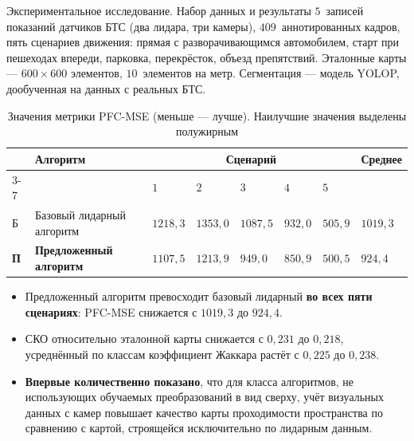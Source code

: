 \begin{frame}{Экспериментальное исследование. Набор данных и результаты}
	\fontsize{7}{8.4}\selectfont
	$5$~записей показаний датчиков БТС (два лидара, три камеры), $409$~аннотированных кадров, пять сценариев движения: прямая с разворачивающимся автомобилем, старт при пешеходах впереди, парковка, перекрёсток, объезд препятствий. Эталонные карты --- $600\times600$ элементов, $10$~элементов на метр. Сегментация --- модель YOLOP, дообученная на данных с реальных БТС.
	\begin{table}
		\footnotesize
		\centering
		\begin{tabular}{|p{}|p{}|p{}|p{}|p{}|p{}|p{}|p{}|}
			\hline
			& \textbf{Алгоритм} & \multicolumn{5}{c|}{\textbf{Сценарий}} & \textbf{Среднее} \\
			\cline{3-7}
			& & $1$ & $2$ & $3$ & $4$ & $5$ & \\
			\hline
			Б & Базовый лидарный алгоритм & $1218,3$ & $1353,0$ & $1087,5$ & $932,0$ & $505,9$ & $1019,3$ \\
			\hline
			\textbf{П} & \textbf{Предложенный алгоритм} & \boldmath$1107,5$ & \boldmath$1213,9$ & \boldmath$949,0$ & \boldmath$850,9$ & \boldmath$500,5$ & \boldmath$924,4$ \\
			\hline
		\end{tabular}
		\caption{\fontsize{6}{7}\selectfont Значения метрики PFC-MSE (меньше --- лучше). Наилучшие значения выделены полужирным}
	\end{table}

	\vspace{-0.7em}
	\begin{itemize}
		\item Предложенный алгоритм превосходит базовый лидарный \textbf{во всех пяти сценариях}: PFC-MSE снижается с $1019,3$ до $924,4$.
		\item СКО относительно эталонной карты снижается с $0,231$ до $0,218$, усреднённый по классам коэффициент Жаккара растёт с $0,225$ до $0,238$.
		\item \textbf{Впервые количественно показано}, что для класса алгоритмов, не использующих обучаемых преобразований в вид сверху, учёт визуальных данных с камер повышает качество карты проходимости пространства по сравнению с картой, строящейся исключительно по лидарным данным.
	\end{itemize}
\end{frame}

